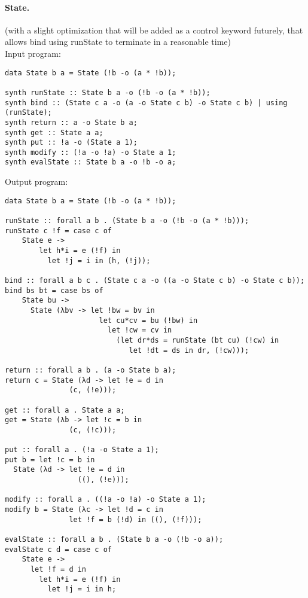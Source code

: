\documentclass{llncs}
\newcommand{\mypara}[1]{\paragraph{\textbf{#1}.}}
\begin{document}
\mypara{State} (with a slight optimization that will be added as a control keyword
futurely, that allows bind using runState to terminate in a reasonable time)
\\
Input program:
\begin{verbatim}
data State b a = State (!b -o (a * !b));

synth runState :: State b a -o (!b -o (a * !b));
synth bind :: (State c a -o (a -o State c b) -o State c b) | using (runState);
synth return :: a -o State b a;
synth get :: State a a;
synth put :: !a -o (State a 1);
synth modify :: (!a -o !a) -o State a 1;
synth evalState :: State b a -o !b -o a;
\end{verbatim}
Output program:
\begin{verbatim}
data State b a = State (!b -o (a * !b));

runState :: forall a b . (State b a -o (!b -o (a * !b)));
runState c !f = case c of
    State e ->
        let h*i = e (!f) in
          let !j = i in (h, (!j));

bind :: forall a b c . (State c a -o ((a -o State c b) -o State c b));
bind bs bt = case bs of
    State bu ->
      State (λbv -> let !bw = bv in
                      let cu*cv = bu (!bw) in
                        let !cw = cv in
                          (let dr*ds = runState (bt cu) (!cw) in
                             let !dt = ds in dr, (!cw)));

return :: forall a b . (a -o State b a);
return c = State (λd -> let !e = d in
               (c, (!e)));

get :: forall a . State a a;
get = State (λb -> let !c = b in
               (c, (!c)));

put :: forall a . (!a -o State a 1);
put b = let !c = b in
  State (λd -> let !e = d in
                 ((), (!e)));

modify :: forall a . ((!a -o !a) -o State a 1);
modify b = State (λc -> let !d = c in
               let !f = b (!d) in ((), (!f)));

evalState :: forall a b . (State b a -o (!b -o a));
evalState c d = case c of
    State e ->
      let !f = d in
        let h*i = e (!f) in
          let !j = i in h;
\end{verbatim}
\end{document}
